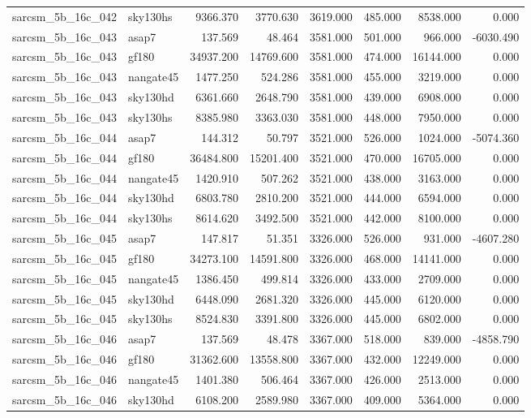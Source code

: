 \begin{tabular}{llrrrrrr}
sarcsm\_5b\_16c\_042 & sky130hs & 9366.370 & 3770.630 & 3619.000 & 485.000 & 8538.000 & 0.000 \\
sarcsm\_5b\_16c\_043 & asap7 & 137.569 & 48.464 & 3581.000 & 501.000 & 966.000 & -6030.490 \\
sarcsm\_5b\_16c\_043 & gf180 & 34937.200 & 14769.600 & 3581.000 & 474.000 & 16144.000 & 0.000 \\
sarcsm\_5b\_16c\_043 & nangate45 & 1477.250 & 524.286 & 3581.000 & 455.000 & 3219.000 & 0.000 \\
sarcsm\_5b\_16c\_043 & sky130hd & 6361.660 & 2648.790 & 3581.000 & 439.000 & 6908.000 & 0.000 \\
sarcsm\_5b\_16c\_043 & sky130hs & 8385.980 & 3363.030 & 3581.000 & 448.000 & 7950.000 & 0.000 \\
sarcsm\_5b\_16c\_044 & asap7 & 144.312 & 50.797 & 3521.000 & 526.000 & 1024.000 & -5074.360 \\
sarcsm\_5b\_16c\_044 & gf180 & 36484.800 & 15201.400 & 3521.000 & 470.000 & 16705.000 & 0.000 \\
sarcsm\_5b\_16c\_044 & nangate45 & 1420.910 & 507.262 & 3521.000 & 438.000 & 3163.000 & 0.000 \\
sarcsm\_5b\_16c\_044 & sky130hd & 6803.780 & 2810.200 & 3521.000 & 444.000 & 6594.000 & 0.000 \\
sarcsm\_5b\_16c\_044 & sky130hs & 8614.620 & 3492.500 & 3521.000 & 442.000 & 8100.000 & 0.000 \\
sarcsm\_5b\_16c\_045 & asap7 & 147.817 & 51.351 & 3326.000 & 526.000 & 931.000 & -4607.280 \\
sarcsm\_5b\_16c\_045 & gf180 & 34273.100 & 14591.800 & 3326.000 & 468.000 & 14141.000 & 0.000 \\
sarcsm\_5b\_16c\_045 & nangate45 & 1386.450 & 499.814 & 3326.000 & 433.000 & 2709.000 & 0.000 \\
sarcsm\_5b\_16c\_045 & sky130hd & 6448.090 & 2681.320 & 3326.000 & 445.000 & 6120.000 & 0.000 \\
sarcsm\_5b\_16c\_045 & sky130hs & 8524.830 & 3391.800 & 3326.000 & 445.000 & 6802.000 & 0.000 \\
sarcsm\_5b\_16c\_046 & asap7 & 137.569 & 48.478 & 3367.000 & 518.000 & 839.000 & -4858.790 \\
sarcsm\_5b\_16c\_046 & gf180 & 31362.600 & 13558.800 & 3367.000 & 432.000 & 12249.000 & 0.000 \\
sarcsm\_5b\_16c\_046 & nangate45 & 1401.380 & 506.464 & 3367.000 & 426.000 & 2513.000 & 0.000 \\
sarcsm\_5b\_16c\_046 & sky130hd & 6108.200 & 2589.980 & 3367.000 & 409.000 & 5364.000 & 0.000 \\

\end{tabular}
